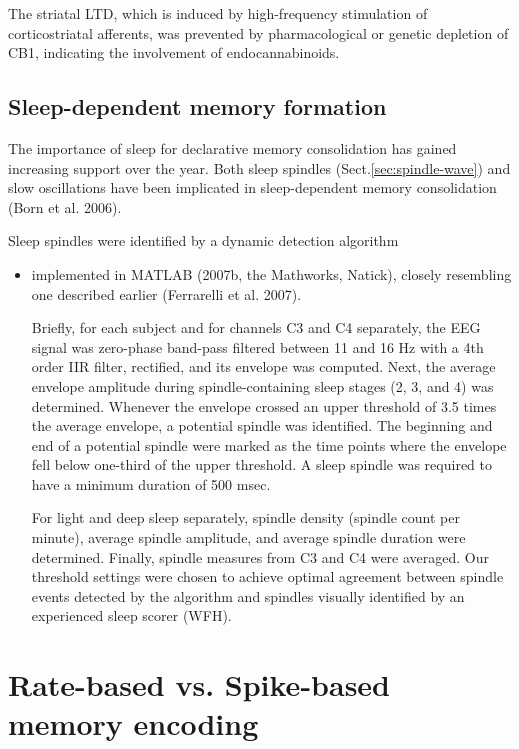 The striatal LTD, which is induced by high-frequency stimulation of
corticostriatal afferents, was prevented by pharmacological or genetic depletion
of CB1, indicating the involvement of endocannabinoids.




\section{Sleep-dependent memory formation}
\label{sec:sleep-dependent-memory-formation}

The importance of sleep for declarative memory consolidation has gained
increasing support over the year.
Both sleep spindles (Sect.\ref{sec:spindle-wave}) and slow oscillations have
been implicated in sleep-dependent memory consolidation (Born et al. 2006).


Sleep spindles were identified by a dynamic detection algorithm
\begin{itemize}
  \item  implemented in MATLAB (2007b, the Mathworks, Natick), closely resembling one described earlier
(Ferrarelli et al. 2007).

Briefly, for each subject and for channels C3 and C4 separately, the EEG signal
was zero-phase band-pass filtered between 11 and 16 Hz with a 4th order IIR
filter, rectified, and its envelope was computed.
Next, the average envelope amplitude during spindle-containing sleep stages (2,
3, and 4) was determined. Whenever the envelope crossed an upper threshold of
3.5 times the average envelope, a potential spindle was identified. The
beginning and end of a potential spindle were marked as the time points where
the envelope fell below one-third of the upper threshold. A sleep spindle was
required to have a minimum duration of 500 msec.

For light and deep sleep separately, spindle density (spindle count per minute),
average spindle amplitude, and average spindle duration were determined.
Finally, spindle measures from C3 and C4 were averaged. Our threshold settings
were chosen to achieve optimal agreement between spindle events detected by the
algorithm and spindles visually identified by an experienced sleep scorer (WFH).


\end{itemize}

\chapter{Rate-based vs. Spike-based memory encoding}

